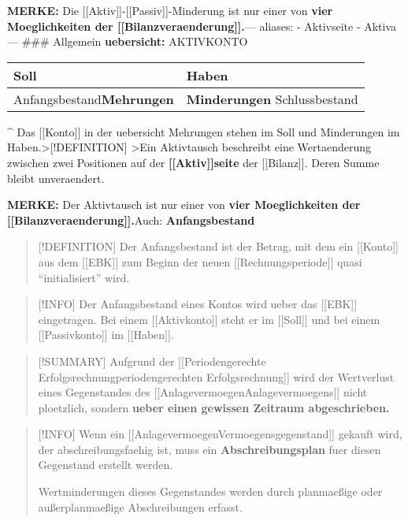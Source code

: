 \textbf{MERKE:} Die {[}{[}Aktiv{]}{]}-{[}{[}Passiv{]}{]}-Minderung ist
nur einer von \textbf{vier Moeglichkeiten der
{[}{[}Bilanzveraenderung{]}{]}.}--- aliases: - Aktivseite - Aktiva ---
\#\#\# Allgemein \textbf{uebersicht:} AKTIVKONTO

\begin{longtable}[]{@{}ll@{}}
\toprule\noalign{}
Soll & Haben \\
\midrule\noalign{}
\endhead
\bottomrule\noalign{}
\endlastfoot
Anfangsbestand\textbf{Mehrungen} & \textbf{Minderungen}
Schlussbestand \\
\end{longtable}

\^{} Das {[}{[}Konto{]}{]} in der uebersicht Mehrungen stehen im Soll und
Minderungen im Haben.\textgreater{[}!DEFINITION{]} \textgreater Ein
Aktivtausch beschreibt eine Wertaenderung zwischen zwei Positionen auf
der \textbf{{[}{[}Aktiv{]}{]}seite} der {[}{[}Bilanz{]}{]}. Deren Summe
bleibt unveraendert.

\textbf{MERKE:} Der Aktivtausch ist nur einer von \textbf{vier
Moeglichkeiten der {[}{[}Bilanzveraenderung{]}{]}.}Auch:
\textbf{Anfangsbestand}

\begin{quote}
{[}!DEFINITION{]} Der Anfangsbestand ist der Betrag, mit dem ein
{[}{[}Konto{]}{]} aus dem {[}{[}EBK{]}{]} zum Beginn der neuen
{[}{[}Rechnungsperiode{]}{]} quasi ``initialisiert'' wird.
\end{quote}

\begin{quote}
{[}!INFO{]} Der Anfangsbestand eines Kontos wird ueber das
{[}{[}EBK{]}{]} eingetragen. Bei einem {[}{[}Aktivkonto{]}{]} steht er
im {[}{[}Soll{]}{]} und bei einem {[}{[}Passivkonto{]}{]} im
{[}{[}Haben{]}{]}.
\end{quote}

\begin{quote}
{[}!SUMMARY{]} Aufgrund der {[}{[}Periodengerechte
Erfolgsrechnung\textbar periodengerechten Erfolgsrechnung{]}{]} wird der
Wertverlust eines Gegenstandes des
{[}{[}Anlagevermoegen\textbar Anlagevermoegens{]}{]} nicht ploetzlich,
sondern \textbf{ueber einen gewissen Zeitraum abgeschrieben.}
\end{quote}

\begin{quote}
{[}!INFO{]} Wenn ein
{[}{[}Anlagevermoegen\textbar Vermoegensgegenstand{]}{]} gekauft wird, der
abschreibungsfaehig ist, muss ein \textbf{Abschreibungsplan} fuer diesen
Gegenstand erstellt werden.

Wertminderungen dieses Gegenstandes werden durch planmaeßige oder
außerplanmaeßige Abschreibungen erfasst.
\end{quote}


